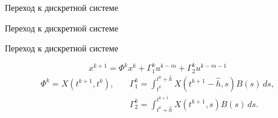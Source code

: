         \begin{frame}[t]{Переход к дискретной системе}
                \centering
        \end{frame}
        \begin{frame}[t]{Переход к дискретной системе}
                \centering
                
        \end{frame}
        \begin{frame}[t]{Переход к дискретной системе}
                \centering
                
                \begin{equation*}
                        \boxed{
                                x^{k+1}
                                =
                                \Phi^k x^k + \Gamma_1^k u^{k-m} + \Gamma_2^k u^{k-m-1}
                        }
                \end{equation*}
                \begin{equation*}
                        \begin{aligned}
                                \Phi^k = X(t^{k+1},t^k), \quad
                                &\Gamma_1^k
                                =
                                \int_{t^k}^{t^{k} + \hat h} X(t^{k+1} - \hat h,s)B(s)\,ds,
                                \\
                                &\Gamma_2^k
                                =
                                \int_{t^{k} + \hat h}^{t^{k+1}} X(t^{k+1},s)B(s)\,ds.
                        \end{aligned}
                \end{equation*}
        \end{frame}

